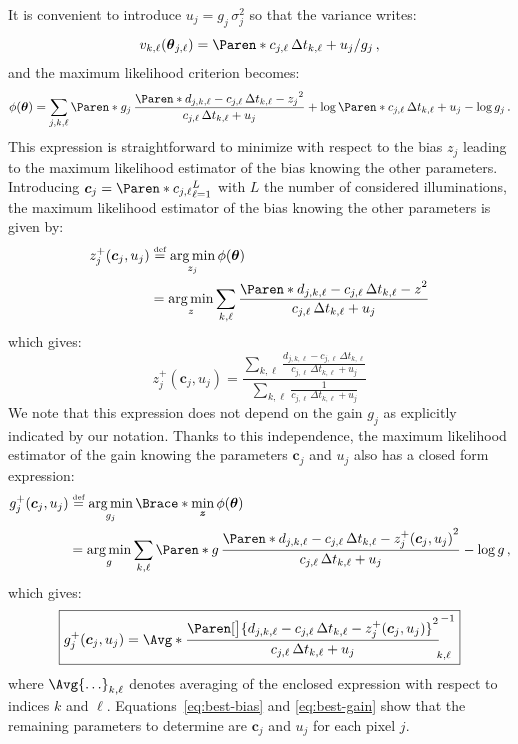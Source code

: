 \documentclass[a4paper,11pt,twoside]{scrartcl}
\DeclareMathOperator*{\argmin}{arg\,min}
\newcommand*{\bydef}{\stackrel{{\scriptscriptstyle \text{def}}}{=}}
\newcommand*{\V}[1]{\boldsymbol{#1}}   %
\theoremstyle{plain} %
\theoremstyle{definition}
\theoremstyle{remark}
\begin{document}
It is convenient to introduce $u_j = g_j\,\sigma^2_j$ so that the variance
writes:
\begin{equation}
  v_{k,\ell}(\V\theta_{j,\ell}) =
  \Paren*{c_{j,\ell}\,\Delta t_{k,\ell} + u_j}/g_j \,,
\end{equation}
and the maximum likelihood criterion becomes:
\begin{equation}
  \phi(\V\theta) = \sum_{j,k,\ell}\Paren*{
    g_j\,\frac{
      \Paren*{d_{j,k,\ell} - c_{j,\ell}\,\Delta t_{k,\ell} - z_j}^2
    }{
      c_{j,\ell}\,\Delta t_{k,\ell} + u_j
    }
    + \log\Paren*{c_{j,\ell}\,\Delta t_{k,\ell} + u_j} - \log g_j
  } \,.
\end{equation}
This expression is straightforward to minimize with respect to the bias $z_j$
leading to the maximum likelihood estimator of the bias knowing the other
parameters. Introducing $\V c_j = \Paren*{c_{j,\ell}}_{\ell=1}^L$ with $L$ the
number of considered illuminations, the maximum likelihood estimator of the
bias knowing the other parameters is given by:
\begin{align*}
  z^+_j(\V c_j, u_j)
  &\bydef \argmin_{z_j} \phi(\V\theta) \notag\\
  &= \argmin_{z} \sum_{k,\ell}\frac{
    \Paren*{d_{j,k,\ell} - c_{j,\ell}\,\Delta t_{k,\ell} - z}^2
  }{
    c_{j,\ell}\,\Delta t_{k,\ell} + u_j
  }
\end{align*}
which gives:
\begin{equation}
  \boxed{
    z^+_j(\V c_j, u_j) = \frac{
      \sum_{k,\ell}\frac{
        d_{j,k,\ell} - c_{j,\ell}\,\Delta t_{k,\ell}
      }{
        c_{j,\ell}\,\Delta t_{k,\ell} + u_j
      }
    }{
      \sum_{k,\ell}\frac{1}{c_{j,\ell}\,\Delta t_{k,\ell} + u_j}
    }
  }
  \label{eq:best-bias}
\end{equation}
We note that this expression does not depend on the gain $g_j$ as explicitly
indicated by our notation. Thanks to this independence, the maximum likelihood
estimator of the gain knowing the parameters $\V c_j$ and $u_j$ also has a
closed form expression:
\begin{align*}
  g^+_j(\V c_j, u_j)
  &\bydef \argmin_{g_j} \Brace*{ \min_{\V z} \phi(\V\theta) } \notag\\
  &= \argmin_{g} \sum_{k,\ell} \Paren*{
    g\,\frac{
      \Paren*{
        d_{j,k,\ell} - c_{j,\ell}\,\Delta t_{k,\ell} - z^+_j(\V c_j, u_j)
      }^2
    }{
      c_{j,\ell}\,\Delta t_{k,\ell} + u_j
    } - \log g
  } \,,
\end{align*}
which gives:
\begin{equation}
  \boxed{
    g^+_j(\V c_j, u_j) = \Avg*{
      \frac{
        \Paren[\big]{
          d_{j,k,\ell} -c_{j,\ell}\,\Delta t_{k,\ell} - z^+_j(\V c_j, u_j)
        }^2
      }{
        c_{j,\ell}\,\Delta t_{k,\ell} + u_j
      }
    }_{\!\!k,\ell}^{-1}
  }
  \label{eq:best-gain}
\end{equation}
where $\Avg{\ldots}_{k,\ell}$ denotes averaging of the enclosed expression with
respect to indices $k$ and $\ell$. Equations~\eqref{eq:best-bias} and
\eqref{eq:best-gain} show that the remaining parameters to determine are $\V
c_j$ and $u_j$ for each pixel $j$.
\end{document}
